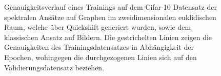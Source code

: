 \begin{figure}[t]
\begin{tikzpicture}[scale=1.4]
\end{tikzpicture}
\caption[\gls{Cifar}-10 Genauigkeitsverlauf über Quickshift]{Genauigkeitsverlauf eines Trainings auf dem \gls{Cifar}-10 Datensatz der spektralen Ansätze auf Graphen im zweidimensionalen euklidischen Raum, welche über Quickshift generiert wurden, sowie dem klassischen Ansatz auf Bildern.
Die gestrichelten Linien zeigen die Genauigkeiten des Trainingsdatensatzes in Abhängigkeit der Epochen, wohingegen die durchgezogenen Linien sich auf den Validierungsdatensatz beziehen.}
\label{fig:cifar_10_train}
\end{figure}
